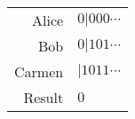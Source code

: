 
\begin{tabular}{r|l}
     Alice & $0|000 \cdots $ \\
     Bob & $0|101 \cdots $ \\
     Carmen & $|1011 \cdots$ \\ \hline
     Result & $0$\\
\end{tabular}